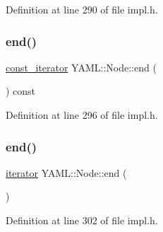 Definition at line 290 of file impl.\+h.

\mbox{\label{class_y_a_m_l_1_1_node_a552f8a322701be4601ff268e1c2b67e7}} 
\subsubsection{\texorpdfstring{end()}{end()}\hspace{0.1cm}{\footnotesize\ttfamily [1/2]}}
{\footnotesize\ttfamily \mbox{\hyperlink{class_y_a_m_l_1_1_node_a40d235ac56001961929189a33c923d6c}{const\+\_\+iterator}} Y\+A\+M\+L\+::\+Node\+::end (\begin{DoxyParamCaption}{ }\end{DoxyParamCaption}) const\hspace{0.3cm}{\ttfamily [inline]}}



Definition at line 296 of file impl.\+h.

\mbox{\label{class_y_a_m_l_1_1_node_a703a31bfe6f54c773c8688e6c924d9ed}} 
\subsubsection{\texorpdfstring{end()}{end()}\hspace{0.1cm}{\footnotesize\ttfamily [2/2]}}
{\footnotesize\ttfamily \mbox{\hyperlink{class_y_a_m_l_1_1_node_a3004302ddd5d977af0a6da29af38f7f4}{iterator}} Y\+A\+M\+L\+::\+Node\+::end (\begin{DoxyParamCaption}{ }\end{DoxyParamCaption})\hspace{0.3cm}{\ttfamily [inline]}}



Definition at line 302 of file impl.\+h.

\mbox{\label{class_y_a_m_l_1_1_node_ae5e192ad9ed22a602b1242ccae9486ce}} 
